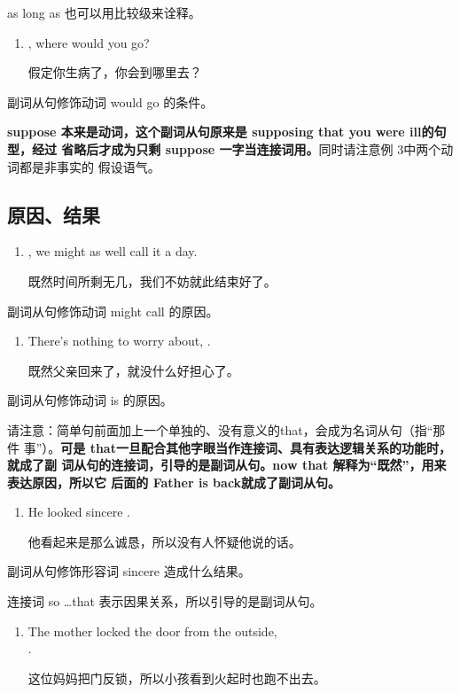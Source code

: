 as long as 也可以用比较级来诠释。
\begin{enumerate}[resume]
\item {} , where would you go?

  假定你生病了，你会到哪里去？
\end{enumerate}
副词从句修饰动词 would go 的条件。

\textbf{suppose 本来是动词，这个副词从句原来是 supposing that you were ill的句型，经过
  省略后才成为只剩 suppose 一字当连接词用。}同时请注意例 3中两个动词都是非事实的
假设语气。

\subsection{原因、结果}

\begin{enumerate}
\item {} , we might as
  well call it a day.

  既然时间所剩无几，我们不妨就此结束好了。
\end{enumerate}
副词从句修饰动词 might call 的原因。

\begin{enumerate}[resume]
\item There's nothing to worry about,  .

  既然父亲回来了，就没什么好担心了。
\end{enumerate}
副词从句修饰动词 is 的原因。

请注意：简单句前面加上一个单独的、没有意义的that，会成为名词从句（指“那件
事”）。\textbf{可是 that一旦配合其他字眼当作连接词、具有表达逻辑关系的功能时，就成了副
  词从句的连接词，引导的是副词从句。now that 解释为“既然”，用来表达原因，所以它
  后面的 Father is back就成了副词从句。}

\begin{enumerate}[resume]
\item He looked  sincere  .

他看起来是那么诚恳，所以没有人怀疑他说的话。
\end{enumerate}
副词从句修饰形容词 sincere 造成什么结果。

连接词 so \ldots that 表示因果关系，所以引导的是副词从句。

\begin{enumerate}[resume]
\item The mother locked the door from the outside,  \\
  .

  这位妈妈把门反锁，所以小孩看到火起时也跑不出去。
\end{enumerate}

